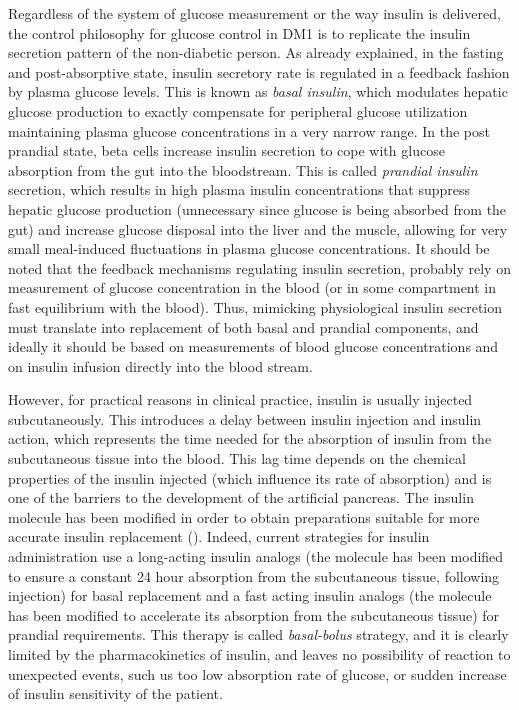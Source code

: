 Regardless of the system of glucose measurement or the way insulin is delivered, the control philosophy for glucose control in DM1 is to replicate the insulin secretion pattern of the non-diabetic person. As already explained, in the fasting and post-absorptive state, insulin secretory rate is regulated in a feedback fashion by plasma glucose levels. This is known as \emph{basal insulin}, which modulates hepatic glucose production to exactly compensate for peripheral glucose utilization maintaining plasma glucose concentrations in a very narrow range. In the post prandial state, beta cells increase insulin secretion to cope with glucose absorption from the gut into the bloodstream. This is called \emph{prandial insulin} secretion, which results in high plasma insulin concentrations that suppress hepatic glucose production (unnecessary since glucose is being absorbed from the gut) and increase glucose disposal into the liver and the muscle, allowing for very small meal-induced fluctuations in plasma glucose concentrations. It should be noted that the feedback mechanisms regulating insulin secretion, probably rely on measurement of glucose concentration in the blood (or in some compartment in fast equilibrium with the blood). Thus, mimicking physiological insulin secretion must translate into replacement of both basal and prandial components, and ideally it should be based on measurements of blood glucose concentrations and on insulin infusion directly into the blood stream. %

However, for practical reasons in clinical practice, insulin is usually injected subcutaneously. This introduces a delay between insulin injection and insulin action, which represents the time needed for the absorption of insulin from the subcutaneous tissue into the blood. This lag time depends on the chemical properties of the insulin injected (which influence its rate of absorption) and  is one of the barriers to the development of the artificial pancreas. The insulin molecule has been modified in order to obtain preparations suitable for more accurate insulin replacement (\cite{rossetti2008superiority}). Indeed, current strategies for insulin administration use a long-acting insulin analogs (the molecule has been modified to ensure a constant 24 hour absorption from the subcutaneous tissue, following injection) for basal replacement and a fast acting insulin analogs (the molecule has been modified to accelerate its absorption from the subcutaneous tissue) for prandial requirements. This therapy is called \emph{basal-bolus} strategy, and it is clearly limited by the pharmacokinetics of insulin, and leaves no possibility of reaction to unexpected events, such us too low absorption rate of glucose, or sudden increase of insulin sensitivity of the patient.

